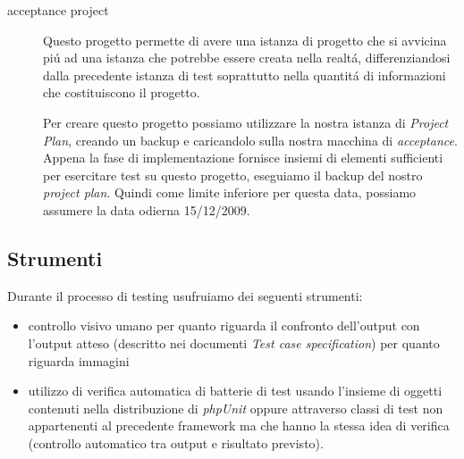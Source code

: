 \begin{description}
 \item[acceptance project] Questo progetto permette di avere una istanza di
 progetto che si avvicina pi\'u ad una istanza che potrebbe essere creata nella
 realt\'a, differenziandosi dalla precedente istanza di test soprattutto nella
 quantit\'a di informazioni che costituiscono il progetto. 
 
 Per creare questo progetto possiamo utilizzare la nostra istanza di
 \emph{Project Plan}, creando un backup e caricandolo sulla nostra macchina di
 \emph{acceptance}. Appena la fase di implementazione fornisce insiemi di
 elementi sufficienti per esercitare test su questo progetto, eseguiamo il
 backup del nostro \emph{project plan}. Quindi come limite inferiore per questa
 data, possiamo assumere la data odierna 15/12/2009.
 
 \end{description}
 
\subsection{Strumenti}
\label{subsec:testingTools}
Durante il processo di testing usufruiamo dei seguenti strumenti:
\begin{itemize}
  \item controllo visivo umano per quanto riguarda il confronto dell'output
  con l'output atteso (descritto nei documenti \emph{Test case specification})
  per quanto riguarda immagini
  \item utilizzo di verifica automatica di batterie di test usando l'insieme di
  oggetti contenuti nella distribuzione di \emph{phpUnit} oppure attraverso
  classi di test non appartenenti al precedente framework ma che hanno la
  stessa idea di verifica (controllo automatico tra output e risultato
  previsto).
\end{itemize}

